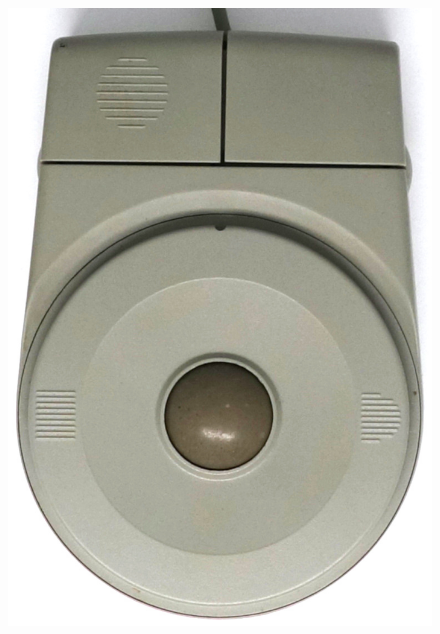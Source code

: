 \documentclass[11pt, a4paper]{article}
\begin{document}
\begin{figure}[h]
    \includegraphics[scale=0.6]{1987_sharp_convertible/topball_30.jpg}

\end{figure}
\end{document}
